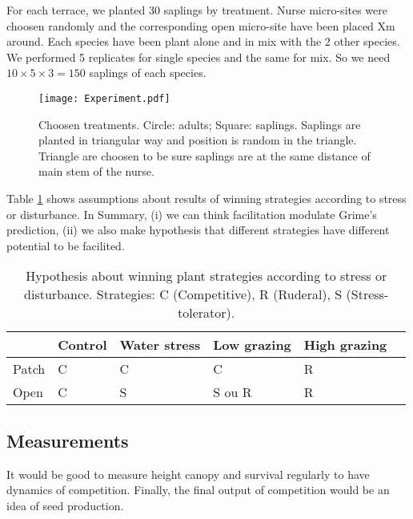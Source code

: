 \documentclass[12pt]{article} %
\begin{document}
For each terrace, we planted 30 saplings by treatment. Nurse micro-sites were choosen randomly and the corresponding open micro-site have been placed Xm around. Each species have been plant alone and in mix with the 2 other species. We performed  5 replicates for single species and the same for mix. So we need $10\times5\times3=150$ saplings of each species.


\begin{figure} %
\begin{center}
\texttt{[image: Experiment.pdf]}
\end{center}
\caption{Choosen treatments. Circle: adults; Square: saplings. Saplings are planted in triangular way and position is random in the triangle. Triangle are choosen to be sure saplings are at the same distance of main stem of the nurse. \label{exp}}
\end{figure}

Table \ref{hyp} shows assumptions about results of winning strategies according to stress or disturbance. In Summary, (i) we can think facilitation modulate Grime's prediction, (ii) we also make hypothesis that different strategies have different potential to be facilited.


\begin{table} %
\begin{center}
\begin{tabular}{|l|l|l|l|l|l|}
  \hline
  & Control & Water stress & Low grazing & High grazing  \\
  \hline
  Patch & C & C & C & R \\
  \hline
  Open & C & S & S ou R & R \\
  \hline
\end{tabular} 
\end{center}
\caption{Hypothesis about winning plant strategies according to stress or disturbance.  Strategies: C (Competitive), R (Ruderal), S (Stress-tolerator). \label{hyp}}
\end{table}

\subsection{Measurements}
It would be good to measure height canopy and survival regularly to have dynamics of competition. Finally, the final output of competition would be an idea of seed production. 
\end{document}
